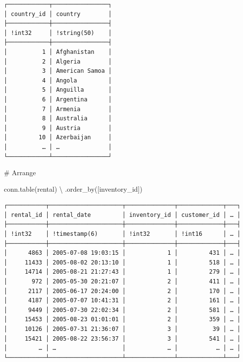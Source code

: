 \documentclass[
  letterpaper,
  DIV=11,
  numbers=noendperiod]{scrreprt}
\newenvironment{Shaded}{\begin{snugshade}}{\end{snugshade}}
\newcommand{\CommentTok}[1]{\textcolor[rgb]{0.37,0.37,0.37}{#1}}
\newcommand{\NormalTok}[1]{\textcolor[rgb]{0.00,0.23,0.31}{#1}}
\newcommand{\OperatorTok}[1]{\textcolor[rgb]{0.37,0.37,0.37}{#1}}
\newcommand{\StringTok}[1]{\textcolor[rgb]{0.13,0.47,0.30}{#1}}
\begin{document}
\begin{verbatim}
┌────────────┬────────────────┐
│ country_id │ country        │
├────────────┼────────────────┤
│ !int32     │ !string(50)    │
├────────────┼────────────────┤
│          1 │ Afghanistan    │
│          2 │ Algeria        │
│          3 │ American Samoa │
│          4 │ Angola         │
│          5 │ Anguilla       │
│          6 │ Argentina      │
│          7 │ Armenia        │
│          8 │ Australia      │
│          9 │ Austria        │
│         10 │ Azerbaijan     │
│          … │ …              │
└────────────┴────────────────┘
\end{verbatim}

\begin{Shaded}
\begin{Highlighting}[]
\CommentTok{\# Arrange }

\NormalTok{conn.table(}\StringTok{\textquotesingle{}rental\textquotesingle{}}\NormalTok{) }\OperatorTok{\textbackslash{}}
\NormalTok{    .order\_by([}\StringTok{\textquotesingle{}inventory\_id\textquotesingle{}}\NormalTok{])}
\end{Highlighting}
\end{Shaded}

\begin{verbatim}
┌───────────┬─────────────────────┬──────────────┬─────────────┬───┐
│ rental_id │ rental_date         │ inventory_id │ customer_id │ … │
├───────────┼─────────────────────┼──────────────┼─────────────┼───┤
│ !int32    │ !timestamp(6)       │ !int32       │ !int16      │ … │
├───────────┼─────────────────────┼──────────────┼─────────────┼───┤
│      4863 │ 2005-07-08 19:03:15 │            1 │         431 │ … │
│     11433 │ 2005-08-02 20:13:10 │            1 │         518 │ … │
│     14714 │ 2005-08-21 21:27:43 │            1 │         279 │ … │
│       972 │ 2005-05-30 20:21:07 │            2 │         411 │ … │
│      2117 │ 2005-06-17 20:24:00 │            2 │         170 │ … │
│      4187 │ 2005-07-07 10:41:31 │            2 │         161 │ … │
│      9449 │ 2005-07-30 22:02:34 │            2 │         581 │ … │
│     15453 │ 2005-08-23 01:01:01 │            2 │         359 │ … │
│     10126 │ 2005-07-31 21:36:07 │            3 │          39 │ … │
│     15421 │ 2005-08-22 23:56:37 │            3 │         541 │ … │
│         … │ …                   │            … │           … │ … │
└───────────┴─────────────────────┴──────────────┴─────────────┴───┘
\end{verbatim}
\end{document}
